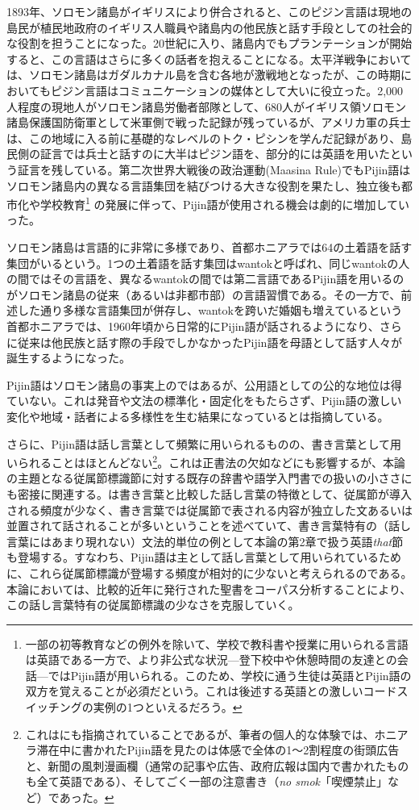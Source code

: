 1893年、ソロモン諸島がイギリスにより併合されると、このピジン言語は現地の島民が植民地政府のイギリス人職員や諸島内の他民族と話す手段としての社会的な役割を担うことになった。20世紀に入り、諸島内でもプランテーションが開始すると、この言語はさらに多くの話者を抱えることになる。太平洋戦争においては、ソロモン諸島はガダルカナル島を含む各地が激戦地となったが、この時期においてもピジン言語はコミュニケーションの媒体として大いに役立った。2,000人程度の現地人がソロモン諸島労働者部隊として、680人がイギリス領ソロモン諸島保護国防衛軍として米軍側で戦った記録が残っているが、アメリカ軍の兵士は、この地域に入る前に基礎的なレベルのトク・ピシンを学んだ記録があり、島民側の証言では兵士と話すのに大半はピジン語を、部分的には英語を用いたという証言を残している。第二次世界大戦後の政治運動(Maasina Rule)でもPijin語はソロモン諸島内の異なる言語集団を結びつける大きな役割を果たし、独立後も都市化や学校教育\footnote{
一部の初等教育などの例外を除いて、学校で教科書や授業に用いられる言語は英語である一方で、より非公式な状況---登下校中や休憩時間の友達との会話---ではPijin語が用いられる。このため、学校に通う生徒は英語とPijin語の双方を覚えることが必須だという。これは後述する英語との激しいコードスイッチングの実例の1つといえるだろう。
}
の発展に伴って、Pijin語が使用される機会は劇的に増加していった。

ソロモン諸島は言語的に非常に多様であり、首都ホニアラでは64の土着語を話す集団がいるという\citep{nativization}。1つの土着語を話す集団はwantokと呼ばれ、同じwantokの人の間ではその言語を、異なるwantokの間では第二言語であるPijin語を用いるのがソロモン諸島の従来（あるいは非都市部）の言語習慣である。その一方で、前述した通り多様な言語集団が併存し、wantokを跨いだ婚姻も増えているという首都ホニアラでは、1960年頃から日常的にPijin語が話されるようになり、さらに従来は他民族と話す際の手段でしかなかったPijin語を母語として話す人々が誕生するようになった。

Pijin語はソロモン諸島の事実上のではあるが、公用語としての公的な地位は得ていない。これは発音や文法の標準化・固定化をもたらさず、Pijin語の激しい変化や地域・話者による多様性を生む結果になっていると\cite{phonology}は指摘している。

さらに、Pijin語は話し言葉として頻繁に用いられるものの、書き言葉として用いられることはほとんどない\footnote{これは\cite{phonology}にも指摘されていることであるが、筆者の個人的な体験では、ホニアラ滞在中に書かれたPijin語を見たのは体感で全体の1～2割程度の街頭広告と、新聞の風刺漫画欄（通常の記事や広告、政府広報は国内で書かれたものも全て英語である）、そしてごく一部の注意書き（\textit{no smok}「喫煙禁止」など）であった。}。これは正書法の欠如などにも影響するが、本論の主題となる従属節標識節に対する既存の辞書や語学入門書での扱いの小ささにも密接に関連する。\cite{chafe}は書き言葉と比較した話し言葉の特徴として、従属節が導入される頻度が少なく、書き言葉では従属節で表される内容が独立した文あるいは並置されて話されることが多いということを述べていて、書き言葉特有の（話し言葉にはあまり現れない）文法的単位の例として本論の第2章で扱う英語\textit{that}節も登場する。すなわち、Pijin語は主として話し言葉として用いられているために、これら従属節標識が登場する頻度が相対的に少ないと考えられるのである。本論においては、比較的近年に発行された聖書をコーパス分析することにより、この話し言葉特有の従属節標識の少なさを克服していく。

